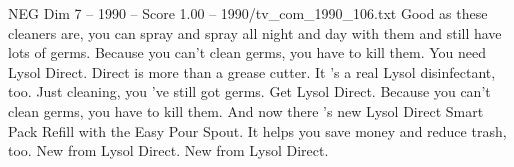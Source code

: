 \begin{textsample}{NEG Dim 7 – 1990 – Score 1.00 – 1990/tv\_com\_1990\_106.txt}  \label{ex:f7_neg_034}
Good as these cleaners are, you can spray and spray all night and day with them and still have lots of germs.
Because you can't clean germs, you have to kill them.
You need Lysol Direct.
Direct is more than a grease cutter.
It 's a real Lysol disinfectant, too.
Just cleaning, you 've still got germs.
Get Lysol Direct.
Because you can't clean germs, you have to kill them.
And now there 's new Lysol Direct Smart Pack Refill with the Easy Pour Spout.
It helps you save money and reduce trash, too.
New from Lysol Direct.
New from Lysol Direct.

\end{textsample}
